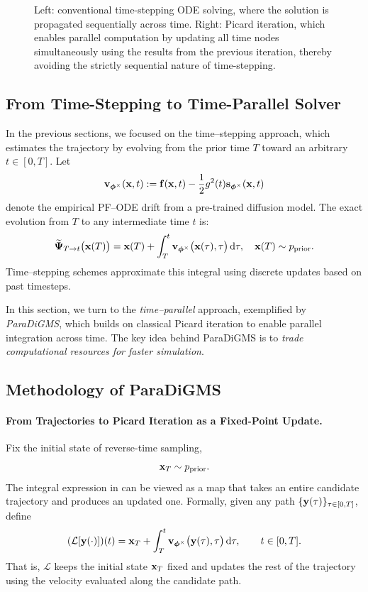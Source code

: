 \begin{figure}[th!]
  \vspace{-0.4em}
  \caption{
Left: conventional time-stepping ODE solving, where the solution is propagated sequentially across time. 
Right: Picard iteration, which enables parallel computation by updating all time nodes simultaneously using the results from the previous iteration, thereby avoiding the strictly sequential nature of time-stepping.
}
\end{figure}



\subsection{From Time-Stepping to Time-Parallel Solver}

In the previous sections, we focused on the time–stepping approach, which estimates the trajectory by evolving from the prior time $T$ toward an arbitrary $t\in[0,T]$. 
Let 
\[
{\mathbf{v}}_{{\bm{\phi}}^\times}({\mathbf{x}},t):={\mathbf{f}}({\mathbf{x}}, t) - \frac{1}{2}g^2(t) {\mathbf{s}}_{{\bm{\phi}}^\times}({\mathbf{x}},t)
\]
denote the empirical PF–ODE drift from a pre-trained diffusion model. The exact evolution from $T$ to any intermediate time $t$ is:
\begin{equation}\label{eq:picard_T_to_t}
    \widetilde{{\bm{\Psi}}}_{T\to t}\big({\mathbf{x}}(T)\big)
    =
    {\mathbf{x}}(T)
    + \int_{T}^{t}{\mathbf{v}}_{{\bm{\phi}}^\times}\big({\mathbf{x}}(\tau),\tau\big)\mathop{}\!\mathrm{d}\tau,
    \quad {\mathbf{x}}(T)\sim p_{\mathrm{prior}}.
\end{equation}
Time–stepping schemes approximate this integral using discrete updates based on past timesteps.  

In this section, we turn to the \emph{time–parallel} approach, exemplified by \emph{ParaDiGMS}, which builds on classical Picard iteration to enable parallel integration across time. The key idea behind ParaDiGMS is to \emph{trade computational resources for faster simulation}.




\subsection{Methodology of ParaDiGMS}


\paragraph{From Trajectories to Picard Iteration as a Fixed-Point Update.}
Fix the initial state of reverse-time sampling,
\[
{\mathbf{x}}_T\sim p_{\mathrm{prior}}.
\]
The integral expression in  can be viewed as a map
that takes an entire candidate trajectory and produces an updated one.
Formally, given any path $\{{\mathbf{y}}(\tau)\}_{\tau\in[0,T]}$, define
\[
(\mathcal{L}[{\mathbf{y}}(\cdot)])(t)
=
{\mathbf{x}}_T
+
\int_T^t
{\mathbf{v}}_{{\bm{\phi}}^\times}\big({\mathbf{y}}(\tau),\tau\big)\mathop{}\!\mathrm{d}\tau,
\qquad
t\in[0,T].
\]
That is, $\mathcal{L}$ keeps the initial state ${\mathbf{x}}_T$ fixed and updates
the rest of the trajectory using the velocity evaluated along the candidate
path.

